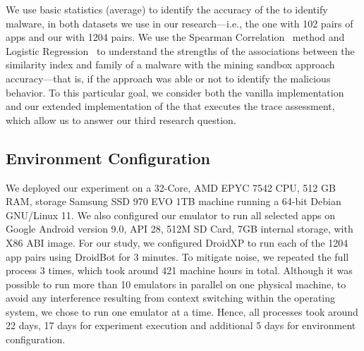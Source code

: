 We use basic statistics (average) to identify the
accuracy of the \mas to identify malware, in both
datasets we use in our research---i.e., the \sds
one with 102 pairs of apps and our \cds with
1204 pairs. We use the Spearman Correlation~\cite{spearman-correlation} method and
Logistic Regression~\cite{statistical-learning} to understand the strengths of
the associations between the similarity index and family of a
malware with the mining sandbox approach accuracy---that is,
if the approach was able or not to identify the malicious behavior.
To this particular goal, we consider
both the vanilla implementation and our extended implementation
of the \mas that executes the trace assessment, which allow us
to answer our third research question. 


\subsection{Environment Configuration}\label{sec:hardware}


We deployed our experiment on a 32-Core, AMD EPYC 7542 CPU, 512 GB RAM, storage Samsung SSD 970 EVO 1TB machine running a 64-bit Debian  GNU/Linux 11. We also configured our emulator to run all selected apps on Google Android version 9.0, API 28, 512M SD Card, 7GB internal storage, with X86 ABI image.
For our study, we configured DroidXP to run each of the 1204 app pairs using DroidBot for 3 minutes. To mitigate noise, we repeated the full process 3 times,  which took around 421 machine hours in total. Although it was possible to run more than 10 emulators in parallel on one physical machine, to avoid any interference resulting from context switching within the operating system, we chose to run one emulator at a time.  Hence, all processes took around 22 days, 17 days for experiment execution and additional 5 days for environment configuration.

